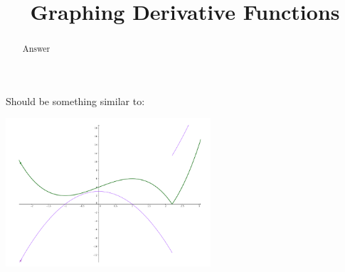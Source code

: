 \documentclass[handout]{ximera}
\title{Graphing Derivative Functions}
\begin{document}
\begin{abstract} Answer %
\end{abstract}

\maketitle

Should be something similar to:

\includegraphics[width=3in]{graph2.png}
\end{document}
